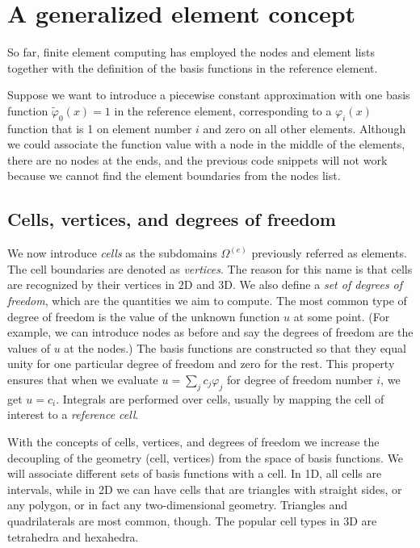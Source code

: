 \documentclass[../main.tex]{subfiles}
\begin{document}
\chapter{A generalized element concept}
\label{chap:chap_6}
\noindent So far, finite element computing has employed the nodes and element lists
together with the definition of the basis functions in the reference element.

Suppose we want to introduce a piecewise constant approximation with one basis function $\tilde{\varphi}_{0}(x)=1$ in the reference element, corresponding to a $\varphi_{i}(x)$ function that is 1 on element number $i$ and zero on all other elements. Although we could associate the function value with a node in the middle of the elements, there are no nodes at the ends, and the previous code snippets will not work because we cannot find the element boundaries from the nodes list.
\section[Cells, vertices, and degrees of freedom]{Cells, vertices, and degrees of freedom}
\label{sec:sec_6_1}
We now introduce \textit{cells} as the subdomains $\Omega^{(e)}$ previously referred as elements. The cell boundaries are denoted as \textit{vertices}. The reason for this name is that cells are recognized by their vertices in $2 \mathrm{D}$ and 3D. We also define a \textit{set of degrees of freedom}, which are the quantities we aim to compute. The most common type of degree of freedom is the value of the unknown function $u$ at some point. (For example, we can introduce nodes as before and say the degrees of freedom are the values of $u$ at the nodes.) The basis functions are constructed so that they equal unity for one particular degree of freedom and zero for the rest. This property ensures that when we evaluate $u=\sum_{j} c_{j} \varphi_{j}$ for degree of freedom number $i$, we get $u=c_{i}$. Integrals are performed over cells, usually by mapping the cell of interest to a \textit{reference cell}.

With the concepts of cells, vertices, and degrees of freedom we increase the decoupling of the geometry (cell, vertices) from the space of basis functions. We will associate different sets of basis functions with a cell. In 1D, all cells are intervals, while in 2D we can have cells that are triangles with straight sides, or any polygon, or in fact any two-dimensional geometry. Triangles and quadrilaterals are most common, though. The popular cell types in $3 \mathrm{D}$ are tetrahedra and hexahedra.
\end{document}
